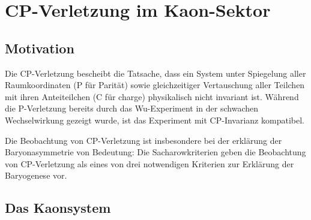 
\section{CP-Verletzung im Kaon-Sektor}


\subsection{Motivation}

Die CP-Verletzung bescheibt die Tatsache, dass ein System unter Spiegelung aller Raumkoordinaten (P für Parität) sowie gleichzeitiger Vertauschung aller Teilchen mit ihren Anteiteilchen (C für charge) physikalisch nicht invariant ist.
Während die P-Verletzung bereits durch das Wu-Experiment in der schwachen Wechselwirkung gezeigt wurde, ist das Experiment mit CP-Invarianz kompatibel.

Die Beobachtung von CP-Verletzung ist insbesondere bei der erklärung der Baryonasymmetrie von Bedeutung: Die Sacharowkriterien geben die Beobachtung von CP-Verletzung als eines von drei notwendigen Kriterien zur Erklärung der Baryogenese vor.

\subsection{Das Kaonsystem}
